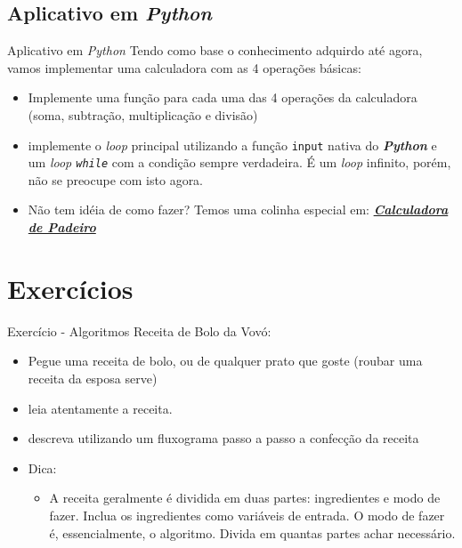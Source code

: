 \documentclass{beamer}
\begin{document}
\subsection{Aplicativo em \textit{Python}}

\begin{frame}{Aplicativo em \textit{Python}}
	\label{aplicativo_em_python}
	Tendo como base o conhecimento adquirdo até agora, vamos implementar uma calculadora com as 4 operações básicas:
	\begin{itemize}
		\item Implemente uma função para cada uma das 4 operações da calculadora (soma, subtração, multiplicação e divisão)
		\item implemente o \textit{loop} principal utilizando a função \texttt{input} nativa do \textbf{\textit{Python}} e um \textit{loop \texttt{while}} com a condição sempre verdadeira. É um \textit{loop} infinito, porém, não se preocupe com isto agora.
		\item Não tem idéia de como fazer? Temos uma colinha especial em: \href{MaoNaMassa/Modulo_01/calculadora.py}{\textbf{\textit{Calculadora de Padeiro}}}
	\end{itemize}

\end{frame}

\section{Exercícios}

\begin{frame}{Exercício - Algoritmos}
	\label{exercicio_01}
Receita de Bolo da Vovó:
	\begin{itemize}
		\item Pegue uma receita de bolo, ou de qualquer prato que goste (roubar uma receita da esposa serve)
		\item leia atentamente a receita.
		\item descreva utilizando um fluxograma passo a passo a confecção da receita
		\item Dica:
		\begin{itemize}
			\item A receita geralmente é dividida em duas partes: ingredientes e modo de fazer. Inclua os ingredientes como variáveis de entrada. O modo de fazer é, essencialmente, o algoritmo. Divida em quantas partes achar necessário.
		\end{itemize}
	\end{itemize}
\end{frame}
\end{document}
